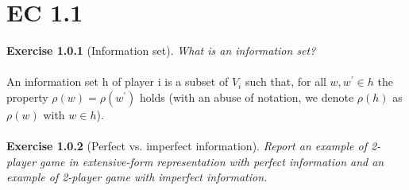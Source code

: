 \section{EC 1.1}

\textbf{Exercise 1.0.1} (Information set). \textit{What is an information set?}\\\\
An information set h of player i is a subset of $ V_{i} $ such that, for all $w, w^{\prime} \in h$ the property $ \rho(w) = \rho(w^{\prime}) $ holds (with an abuse of notation, we denote $ \rho(h)$ as $\rho(w) $ with $w \in h $).\\\\
\textbf{Exercise 1.0.2} (Perfect vs. imperfect information). \textit{Report an example of 2-player game in extensive-form
representation with perfect information and an example of 2-player game with imperfect information.}
